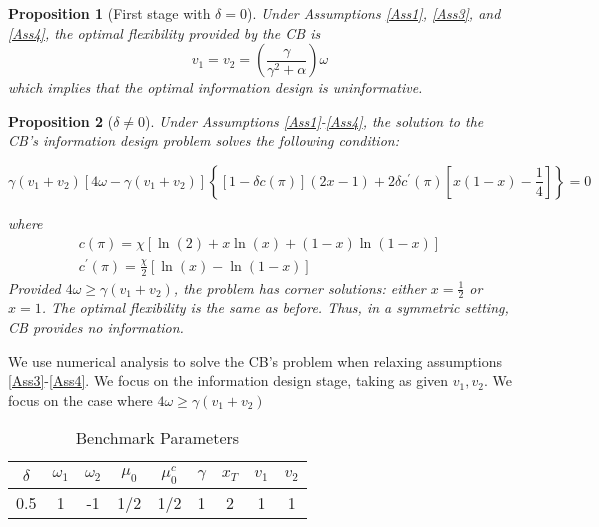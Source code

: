 \documentclass{beamer}
\newtheorem{proposition}{Proposition}
\begin{document}
\begin{frame}[allowframebreaks]
\begin{proposition}[First stage with $\delta=0$]
    \label{Prop2}
    Under Assumptions \ref{Ass1}, \ref{Ass3}, and \ref{Ass4}, the optimal flexibility provided by the CB is
    \begin{equation}
        v_1=v_2=\left(\frac{\gamma}{\gamma^2+\alpha}\right)\omega
    \end{equation}
    which implies that the optimal information design is uninformative.
\end{proposition}
    \begin{proposition}[$\delta\neq0$]
    \label{Prop2}
        Under Assumptions \ref{Ass1}-\ref{Ass4}, the solution to the CB's information design problem solves the following condition:
        \begin{small}
        \begin{equation}
            \gamma(v_1+v_2)[4\omega-\gamma(v_1+v_2)]\left\{[1-\delta c(\pi)](2x-1)+2\delta c^\prime(\pi)\left[x(1-x)-\frac{1}{4}\right]\right\}=0
        \end{equation}
        \end{small}
        where
        \begin{eqnarray}
            c(\pi)=\chi \left[\ln(2)+x\ln(x)+(1-x)\ln(1-x)\right] \\
            c^\prime(\pi)=\frac{\chi}{2}\left[\ln\left(x\right)-\ln(1-x)\right]
        \end{eqnarray}
        Provided $4\omega\geq\gamma(v_1+v_2)$, the problem has corner solutions: either $x=\frac{1}{2}$ or $x=1$. The optimal flexibility is the same as before. Thus, in a symmetric setting, CB provides no information.
    \end{proposition}
    We use numerical analysis to solve the CB's problem when relaxing assumptions \ref{Ass3}-\ref{Ass4}.
    \vskip10pt
    We focus on the information design stage, taking as given $v_1,v_2$. 
    \vskip10pt We focus on the case where $4\omega\geq\gamma(v_1+v_2)$
    \begin{table}[htp!]
    \centering
    \begin{tabular}{@{}ccccccccc@{}}
    \toprule
    $\delta$ & $\omega_1$ & $\omega_2$ & $\mu_0$ & $\mu_0^c$ & $\gamma$ & $x_T$ & $v_1$ & $v_2$ \\ \midrule
    0.5      & 1          & -1         & 1/2     & 1/2       & 1      & 2     & 1 & 1    \\ \bottomrule
    \end{tabular}
    \caption{Benchmark Parameters}
    \label{tab:bchmrk_param}

\end{table}
\end{frame}
\end{document}
